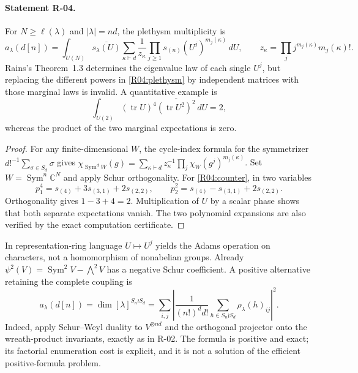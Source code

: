 \documentclass[11pt,a4paper]{article}
\theoremstyle{definition}\newtheorem{definition}{Definition}
\begin{document}
\paragraph{Statement R-04.}
For $N\geq\ell(\lambda)$ and $|\lambda|=nd$, the plethysm multiplicity is
\begin{equation}\label{R04:plethysm}
 a_\lambda(d[n])=\int_{U(N)}\overline{s_\lambda(U)}
 \sum_{\kappa\vdash d}\frac{1}{z_\kappa}
       \prod_{j\geq1}s_{(n)}(U^j)^{m_j(\kappa)}\,dU,
 \qquad z_\kappa=\prod_j j^{m_j(\kappa)}m_j(\kappa)!.
\end{equation}
Rains's Theorem~1.3 determines the eigenvalue law of each single $U^j$,
but replacing the different powers in \eqref{R04:plethysm} by independent
matrices with those marginal laws is invalid. A quantitative example is
\begin{equation}\label{R04:counter}
 \int_{U(2)}(\operatorname{tr}U)^4
        \overline{(\operatorname{tr}U^2)^2}\,dU=2,
\end{equation}
whereas the product of the two marginal expectations is zero.

\begin{proof}
For any finite-dimensional $W$, the cycle-index formula for the
symmetrizer $d!^{-1}\sum_{\sigma\in S_d}\sigma$ gives
$\chi_{\operatorname{Sym}^dW}(g)=\sum_{\kappa\vdash d}
z_\kappa^{-1}\prod_j\chi_W(g^j)^{m_j(\kappa)}$.
Set $W=\operatorname{Sym}^n\mathbb C^N$ and apply Schur orthogonality.
For \eqref{R04:counter}, in two variables
\[
 p_1^4=s_{(4)}+3s_{(3,1)}+2s_{(2,2)},\qquad
 p_2^2=s_{(4)}-s_{(3,1)}+2s_{(2,2)}.
\]
Orthogonality gives $1-3+4=2$. Multiplication of $U$ by a scalar phase
shows that both separate expectations vanish. The two polynomial
expansions are also verified by the exact computation certificate.
\end{proof}

In representation-ring language $U\mapsto U^j$ yields the Adams
operation on characters, not a homomorphism of nonabelian groups.
Already $\psi^2(V)=\operatorname{Sym}^2V-\bigwedge^2V$ has a negative
Schur coefficient. A positive alternative retaining the complete
coupling is
\begin{equation}\label{R04:wreath}
 a_\lambda(d[n])=\dim[\lambda]^{S_n\wr S_d}
 =\sum_{i,j}\left|\frac{1}{(n!)^d d!}
       \sum_{h\in S_n\wr S_d}\rho_\lambda(h)_{ij}\right|^2.
\end{equation}
Indeed, apply Schur--Weyl duality to $V^{\otimes nd}$ and the orthogonal
projector onto the wreath-product invariants, exactly as in R-02.
The formula is positive and exact; its factorial enumeration cost is
explicit, and it is not a solution of the efficient positive-formula
problem.
\end{document}
